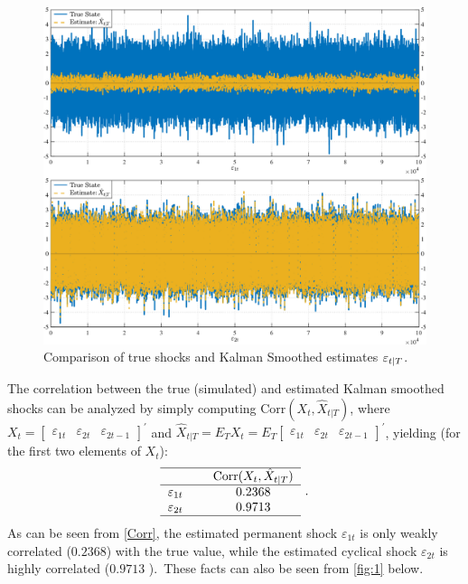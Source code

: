 \documentclass[a4paper,final,12pt]{article}
\begin{document}
\begin{figure}[h]
\centering
\includegraphics[width=1\textwidth,trim={0 0 0 0},clip,angle=00]{HP97_plots.pdf}
\caption{Comparison of true shocks and Kalman Smoothed estimates $\protect%
\varepsilon _{t|T}$.}
\label{fig:1}
\end{figure}
The correlation between the true (simulated) and estimated Kalman smoothed
shocks can be analyzed by simply computing $\mathrm{Corr}(X_{t},\hat{X}%
_{t|T})$, where $X_{t}=%
\begin{bmatrix}
\varepsilon _{1t} & \varepsilon _{2t} & \varepsilon _{2t-1}%
\end{bmatrix}%
^{\prime }$ and $\hat{X}_{t|T}=E_{T}X_{t}=E_{T}%
\begin{bmatrix}
\varepsilon _{1t} & \varepsilon _{2t} & \varepsilon _{2t-1}%
\end{bmatrix}%
^{\prime }$, yielding (for the first two elements of $X_{t}$):%
\begin{equation}
\begin{tabular}{lcc}
\hline
&  & $\mathrm{Corr}(X_{t},\hat{X}_{t|T})$ \\ \hline
$\varepsilon _{1t}$ &  & $0.2368$ \\ 
$\varepsilon _{2t}$ &  & $0.9713$ \\ \hline
\end{tabular}%
~.  \label{Corr}
\end{equation}%
As can be seen from \ref{Corr}, the estimated permanent shock $\varepsilon
_{1t}$ is only weakly correlated ($0.2368$) with the true value, while the
estimated cyclical shock $\varepsilon _{2t}$ is highly correlated ($0.9713$%
).\ These facts can also be seen from \autoref{fig:1} below.
\end{document}
